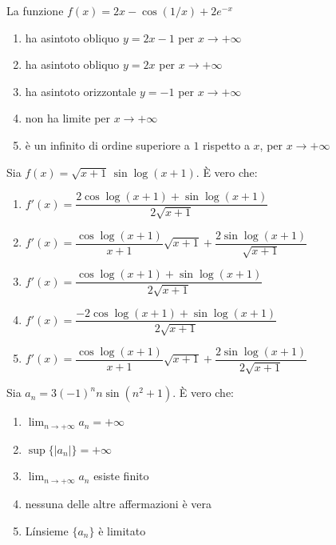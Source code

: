 \begin{quiz}
La funzione $f(x)=2x-\cos(1/x)+2e^{-x}$
\begin{enumerate}
\item ha asintoto obliquo $y=2x-1$ per $x\to+\infty$
\item ha asintoto obliquo $y=2x$ per $x\to+\infty$
\item ha asintoto orizzontale $y=-1$ per $x\to+\infty$
\item non ha limite per $x\to+\infty$
\item \`e un infinito di ordine superiore a $1$ rispetto a $x$, per $x\to+\infty$
\end{enumerate}
\end{quiz}

\begin{quiz}
Sia $f(x)=\sqrt{x+1}\,\sin\log(x+1)$. \`E vero che:
\begin{enumerate}
\item $f\prime(x)=\dfrac{2\cos\log(x+1)+\sin\log(x+1)}{2\sqrt{x+1}}$
\item $f\prime(x)=\dfrac{\cos\log(x+1)}{x+1}\sqrt{x+1}+\dfrac{2\sin\log(x+1)}{\sqrt{x+1}}$
\item $f\prime(x)=\dfrac{\cos\log(x+1)+\sin\log(x+1)}{2\sqrt{x+1}}$
\item $f\prime(x)=\dfrac{-2\cos\log(x+1)+\sin\log(x+1)}{2\sqrt{x+1}}$
\item $f\prime(x)=\dfrac{\cos\log(x+1)}{x+1}\sqrt{x+1}+\dfrac{2\sin\log(x+1)}{2\sqrt{x+1}}$
\end{enumerate}
\end{quiz}

\begin{quiz}
Sia $a_n=3(-1)^n n\sin(n^2+1)$. \`E vero che:
\begin{enumerate}
\item $\lim_{n\to+\infty}a_n=+\infty$
\item $\sup\{|a_n|\}=+\infty$
\item $\lim_{n\to+\infty}a_n$ esiste finito
\item nessuna delle altre affermazioni \`e vera
\item L\'insieme $\{a_n\}$ \`e limitato
\end{enumerate}
\end{quiz}

